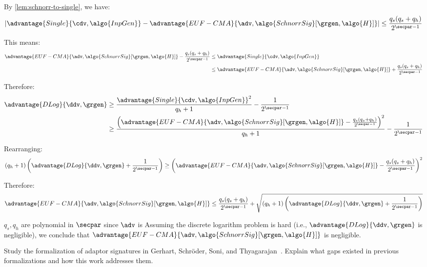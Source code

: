 \begin{mysolution}
  By \autoref{lem:schnorr-to-single}, we have:
  \[
    \left|\advantage{Single}{\cdv, \algo{InpGen}} - \advantage{EUF-CMA}{\adv, \algo{SchnorrSig}[\grgen, \algo{H}]}\right| \leq \frac{q_s(q_s + q_h)}{2^{\secpar-1}}
  \]
  
  This means:
  \begin{align*}
    \advantage{EUF-CMA}{\adv, \algo{SchnorrSig}[\grgen, \algo{H}]} - \frac{q_s(q_s + q_h)}{2^{\secpar-1}} &\leq \advantage{Single}{\cdv, \algo{InpGen}}\\
    &\leq \advantage{EUF-CMA}{\adv, \algo{SchnorrSig}[\grgen, \algo{H}]} + \frac{q_s(q_s + q_h)}{2^{\secpar-1}}
  \end{align*}
  
  Therefore:
  \begin{align*}
    \advantage{DLog}{\ddv, \grgen} &\geq \frac{\advantage{Single}{\cdv, \algo{InpGen}}^2}{q_h + 1} - \frac{1}{2^{\secpar-1}}\\
    &\geq \frac{\left(\advantage{EUF-CMA}{\adv, \algo{SchnorrSig}[\grgen, \algo{H}]} - \frac{q_s(q_s + q_h)}{2^{\secpar-1}}\right)^2}{q_h + 1} - \frac{1}{2^{\secpar-1}}
  \end{align*}
  
  Rearranging:
  \[
    (q_h + 1) \left(\advantage{DLog}{\ddv, \grgen} + \frac{1}{2^{\secpar-1}}\right) \geq \left(\advantage{EUF-CMA}{\adv, \algo{SchnorrSig}[\grgen, \algo{H}]} - \frac{q_s(q_s + q_h)}{2^{\secpar-1}}\right)^2
  \]
  
  Therefore:
  \[
    \advantage{EUF-CMA}{\adv, \algo{SchnorrSig}[\grgen, \algo{H}]} \leq \frac{q_s(q_s + q_h)}{2^{\secpar-1}} + \sqrt{(q_h + 1) \left(\advantage{DLog}{\ddv, \grgen} + \frac{1}{2^{\secpar-1}}\right)}
  \]
  
  $q_s, q_h$ are polynomial in $\secpar$ since $\adv$ is \ppt
  Assuming the discrete logarithm problem is hard (i.e., $\advantage{DLog}{\ddv, \grgen}$ is negligible), we conclude that $\advantage{EUF-CMA}{\adv, \algo{SchnorrSig}[\grgen, \algo{H}]}$ is negligible.
\end{mysolution}
\fi

\begin{exercise}[Optional]
  Study the formalization of adaptor signatures in Gerhart, Schröder, Soni, and Thyagarajan~\cite{EC:GSST24}.
  Explain what gaps existed in previous formalizations and how this work addresses them.
\end{exercise}
